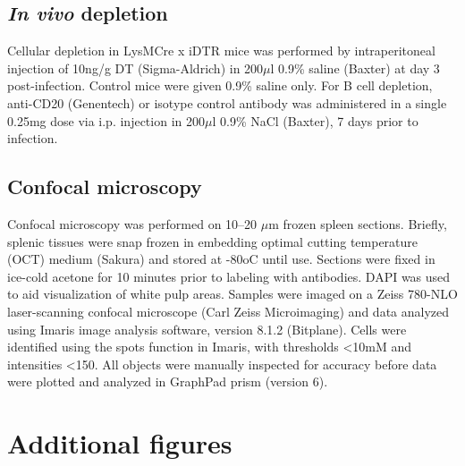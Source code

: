 \subsection{\textit{In vivo} depletion}

Cellular depletion in LysMCre x iDTR mice was performed by intraperitoneal injection of 10ng/g DT (Sigma-Aldrich) in 200\( \mu \)l 0.9\% saline (Baxter) at day 3 post-infection. Control mice were given 0.9\% saline only. For B cell depletion, anti-CD20 (Genentech) or isotype control antibody was administered in a single 0.25mg dose via i.p. injection in 200\( \mu \)l 0.9\% NaCl (Baxter), 7 days prior to infection.

\subsection{Confocal microscopy}

Confocal microscopy was performed on 10–20 \( \mu \)m frozen spleen sections. Briefly, splenic tissues were snap frozen in embedding optimal cutting temperature (OCT) medium (Sakura) and stored at -80oC until use. Sections were fixed in ice-cold acetone for 10 minutes prior to labeling with antibodies. DAPI was used to aid visualization of white pulp areas. Samples were imaged on a Zeiss 780-NLO laser-scanning confocal microscope (Carl Zeiss Microimaging) and data analyzed using Imaris image analysis software, version 8.1.2 (Bitplane). Cells were identified using the spots function in Imaris, with thresholds <10mM and intensities <150. All objects were manually inspected for accuracy before data were plotted and analyzed in GraphPad prism (version 6).

\section{Additional figures}

